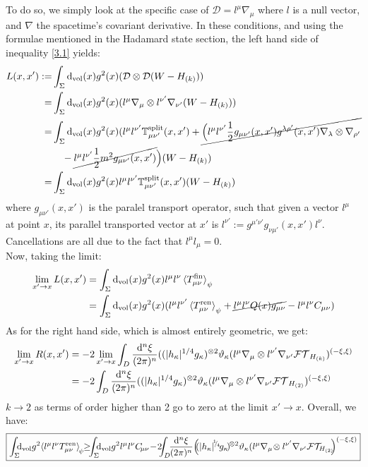 \documentclass[a4paper,11pt]{article}
\numberwithin{equation}{section}
\theoremstyle{definition}
\renewcommand{\d}{{\mathrm{d}}}
\begin{document}
To do so, we simply look at the specific case of $\mathcal{D}=l^\mu\nabla_\mu$ where $l$ is a null vector, and $\nabla$ the spacetime's covariant derivative. In these conditions, and using the formulae mentioned in the Hadamard state section, the left hand side of inequality \ref{3.1} yields:
\begin{align}
    L(x,x'):=& \int_\Sigma \d_\mathrm{vol}(x) g^2(x) (\mathcal{D}\otimes\mathcal{D}(W-H_{(k)}))\notag\\
    =& \int_\Sigma \d_\mathrm{vol}(x) g^2(x) (l^\mu\nabla_\mu\otimes l^{\nu'}\nabla_{\nu'}(W-H_{(k)}))\notag\\
    =& \int_\Sigma \d_\mathrm{vol}(x) g^2(x) (l^\mu l^{\nu'}\mathbb{T}^\mathrm{split}_{\mu\nu'}(x,x')+\cancel{\Big(l^\mu l^{\nu'}\frac{1}{2}g_{\mu\nu'}(x,x')g^{\lambda\rho'}(x,x')\nabla_\lambda\otimes\nabla_{\rho'}}\notag\\
    &\quad - \cancel{l^\mu l^{\nu'}\frac{1}{2}m^2g_{\mu\nu'}(x,x')}\Big)(W-H_{(k)})\notag\\
    =& \int_\Sigma \d_\mathrm{vol}(x) g^2(x) l^\mu l^{\nu'}\mathbb{T}^\mathrm{split}_{\mu\nu'}(x,x')(W-H_{(k)})
\end{align}
where $g_{\mu\nu'}(x,x')$ is the paralel transport operator, such that given a vector $l^\mu$ at point $x$, its parallel transported vector at $x'$ is $l^{\nu'}:=g^{\mu'\nu'}g_{\nu\mu'}(x,x') l^\nu $. Cancellations are all due to the fact that $l^\mu l_\mu=0$.
\\
Now, taking the limit:
\begin{align}
    \lim_{x'\to x}L(x,x') &= \int_\Sigma \d_\mathrm{vol}(x) g^2(x) l^\mu l^\nu\braket{T^\mathrm{fin}_{\mu\nu}}_\psi\notag\\
    &= \int_\Sigma \d_\mathrm{vol}(x) g^2(x) (l^\mu l^{\nu'}\braket{T^\mathrm{ren}_{\mu\nu}}_\psi+\cancel{l^\mu l^\nu Q(x)g_{\mu\nu}}-l^\mu l^\nu C_{\mu\nu})
\end{align}
As for the right hand side, which is almost entirely geometric, we get:
\begin{align}
    \lim_{x'\to x} R(x,x') &= -2\lim_{x'\to x}\int_D\frac{\d^n\xi}{(2\pi)^n}((|h_\kappa|^{1/4}g_\kappa)^{\otimes 2}\vartheta_\kappa(l^\mu\nabla_\mu\otimes l^{\nu'}\nabla_{\nu'}\mathcal{FT}_{H_{(k)}})^{(-\xi,\xi)}\notag\\
    &=-2\int_D\frac{\d^n\xi}{(2\pi)^n}((|h_\kappa|^{1/4}g_\kappa)^{\otimes 2}\vartheta_\kappa(l^\mu\nabla_\mu\otimes l^{\nu'}\nabla_{\nu'}\mathcal{FT}_{H_{(2)}})^{(-\xi,\xi)}
\end{align}
$k\to2$ as terms of order higher than 2 go to zero at the limit $x'\to x$. Overall, we have:
\begin{equation}\label{eq82}
    \boxed{\int_\Sigma \!\!\!\d_\mathrm{vol} g^2 \!\braket{l^\mu l^\nu T^\mathrm{ren}_{\mu\nu}}_{\!\psi} \!\!\geq\!\!\! \int_\Sigma \!\!\!\d_\mathrm{vol} g^2l^\mu l^\nu C_{\!\mu\nu}\!-\!2\!\!\!\int_D\!\!\frac{\d^n\xi}{(2\pi)^n}\!\left(\!\!(|h_\kappa|^{\!^1\!\!/_{\!4}}\!g_\kappa\!)^{\!\otimes 2}\vartheta_\kappa(l^\mu\nabla_\mu\!\otimes l^{\nu'}\nabla_{\nu'}\mathcal{FT}_{\!\!H_{(2)}}\!\!\right)^{(-\xi,\xi)}}
\end{equation}
\end{document}
